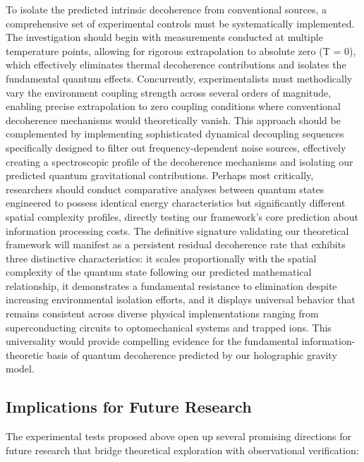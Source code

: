 \documentclass[11pt,english,twoside]{article}
\begin{document}
To isolate the predicted intrinsic decoherence from conventional sources, a comprehensive set of experimental controls must be systematically implemented. The investigation should begin with measurements conducted at multiple temperature points, allowing for rigorous extrapolation to absolute zero (T = 0), which effectively eliminates thermal decoherence contributions and isolates the fundamental quantum effects. Concurrently, experimentalists must methodically vary the environment coupling strength across several orders of magnitude, enabling precise extrapolation to zero coupling conditions where conventional decoherence mechanisms would theoretically vanish. This approach should be complemented by implementing sophisticated dynamical decoupling sequences specifically designed to filter out frequency-dependent noise sources, effectively creating a spectroscopic profile of the decoherence mechanisms and isolating our predicted quantum gravitational contributions. Perhaps most critically, researchers should conduct comparative analyses between quantum states engineered to possess identical energy characteristics but significantly different spatial complexity profiles, directly testing our framework's core prediction about information processing costs. The definitive signature validating our theoretical framework will manifest as a persistent residual decoherence rate that exhibits three distinctive characteristics: it scales proportionally with the spatial complexity of the quantum state following our predicted mathematical relationship, it demonstrates a fundamental resistance to elimination despite increasing environmental isolation efforts, and it displays universal behavior that remains consistent across diverse physical implementations ranging from superconducting circuits to optomechanical systems and trapped ions. This universality would provide compelling evidence for the fundamental information-theoretic basis of quantum decoherence predicted by our holographic gravity model.

\subsection{Implications for Future Research}

The experimental tests proposed above open up several promising directions for future research that bridge theoretical exploration with observational verification:
\end{document}
